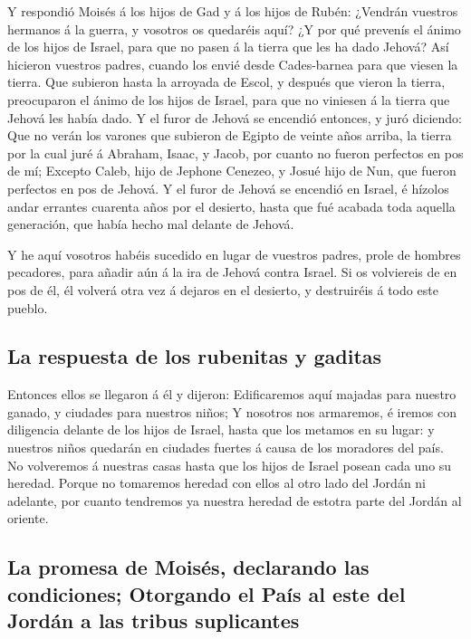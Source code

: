  Y respondió Moisés á los hijos de Gad y á los hijos de
Rubén: ¿Vendrán vuestros hermanos á la guerra, y vosotros os quedaréis
aquí?  ¿Y por qué prevenís el ánimo de los hijos de
Israel, para que no pasen á la tierra que les ha dado Jehová?
 Así hicieron vuestros padres, cuando los envié desde
Cades-barnea para que viesen la tierra.  Que subieron
hasta la arroyada de Escol, y después que vieron la tierra, preocuparon
el ánimo de los hijos de Israel, para que no viniesen á la tierra que
Jehová les había dado.  Y el furor de Jehová se encendió
entonces, y juró diciendo:  Que no verán los varones que
subieron de Egipto de veinte años arriba, la tierra por la cual juré á
Abraham, Isaac, y Jacob, por cuanto no fueron perfectos en pos de mí;
 Excepto Caleb, hijo de Jephone Cenezeo, y Josué hijo de
Nun, que fueron perfectos en pos de Jehová.  Y el furor
de Jehová se encendió en Israel, é hízolos andar errantes cuarenta años
por el desierto, hasta que fué acabada toda aquella generación, que
había hecho mal delante de Jehová.

 Y he aquí vosotros habéis sucedido en lugar de vuestros
padres, prole de hombres pecadores, para añadir aún á la ira de Jehová
contra Israel.  Si os volviereis de en pos de él, él
volverá otra vez á dejaros en el desierto, y destruiréis á todo este
pueblo.

\hypertarget{la-respuesta-de-los-rubenitas-y-gaditas}{%
\subsection{La respuesta de los rubenitas y
gaditas}\label{la-respuesta-de-los-rubenitas-y-gaditas}}

 Entonces ellos se llegaron á él y dijeron: Edificaremos
aquí majadas para nuestro ganado, y ciudades para nuestros niños;
 Y nosotros nos armaremos, é iremos con diligencia
delante de los hijos de Israel, hasta que los metamos en su lugar: y
nuestros niños quedarán en ciudades fuertes á causa de los moradores del
país.  No volveremos á nuestras casas hasta que los hijos
de Israel posean cada uno su heredad.  Porque no
tomaremos heredad con ellos al otro lado del Jordán ni adelante, por
cuanto tendremos ya nuestra heredad de estotra parte del Jordán al
oriente.

\hypertarget{la-promesa-de-moisuxe9s-declarando-las-condiciones-otorgando-el-pauxeds-al-este-del-jorduxe1n-a-las-tribus-suplicantes}{%
\subsection{La promesa de Moisés, declarando las condiciones; Otorgando
el País al este del Jordán a las tribus
suplicantes}\label{la-promesa-de-moisuxe9s-declarando-las-condiciones-otorgando-el-pauxeds-al-este-del-jorduxe1n-a-las-tribus-suplicantes}}

